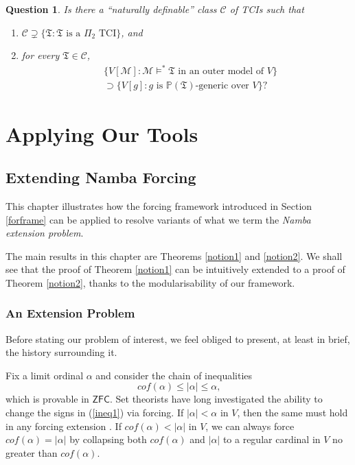 \documentclass[12pt, twoside]{memoir}
\numberwithin{equation}{section}
\newtheorem{ques}[thm]{Question}
\theoremstyle{definition}
\theoremstyle{remark}
\theoremstyle{definition}
\theoremstyle{definition}
\theoremstyle{definition}
\theoremstyle{remark}
\begin{document}
\begin{ques}
Is there a ``naturally definable'' class $\mathcal{C}$ of TCIs such that 
\begin{enumerate}[label=(\alph*)]
    \item $\mathcal{C} \supsetneq \{\mathfrak{T} : \mathfrak{T} \text{ is a } \Pi_2 \text{ TCI}\}$, and
    \item for every $\mathfrak{T} \in \mathcal{C}$, 
    \begin{align*}
        & \{V[\mathcal{M}] : \mathcal{M} \models^* \mathfrak{T} \text{ in an outer model of } V\} \\
        & \supset \{V[g] : g \text{ is } \mathbb{P}(\mathfrak{T}) \text{-generic over } V\} \text{?}
    \end{align*}
\end{enumerate} 
\end{ques}

\part{\texorpdfstring{  Applying Our Tools}{Applying Our Tools}}\label{part3}

\chapter{Extending Namba Forcing}\label{sect2}

This chapter illustrates how the forcing framework introduced in Section \ref{forframe} can be applied to resolve variants of what we term the \textit{Namba extension problem}.

The main results in this chapter are Theorems \ref{notion1} and \ref{notion2}. We shall see that the proof of Theorem \ref{notion1} can be intuitively extended to a proof of Theorem \ref{notion2}, thanks to the modularisability of our framework.

\section{An Extension Problem}

Before stating our problem of interest, we feel obliged to present, at least in brief, the history surrounding it. 

Fix a limit ordinal $\alpha$ and consider the chain of inequalities
\begin{equation}\label{ineq1}
    cof(\alpha) \leq |\alpha| \leq \alpha \text{,}
\end{equation} 
which is provable in $\mathsf{ZFC}$. Set theorists have long investigated the ability to change the signs in (\ref{ineq1}) via forcing. If $|\alpha| < \alpha$ in $V$, then the same must hold in any forcing extension . If $cof(\alpha) < |\alpha|$ in $V$, we can always force $cof(\alpha) = |\alpha|$ by collapsing both $cof(\alpha)$ and $|\alpha|$ to a regular cardinal in $V$ no greater than $cof(\alpha)$.
\end{document}
